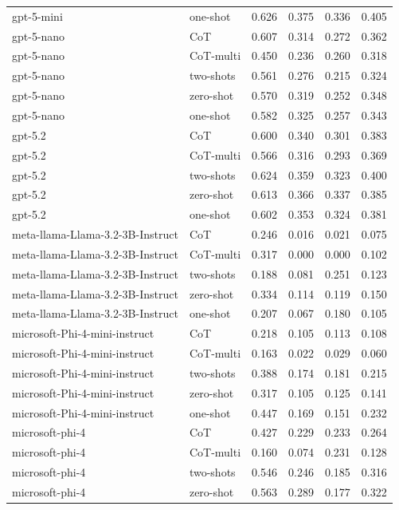 \begin{tabular}{llrrrr}
gpt-5-mini & one-shot & 0.626 & 0.375 & 0.336 & 0.405 \\
gpt-5-nano & CoT & 0.607 & 0.314 & 0.272 & 0.362 \\
gpt-5-nano & CoT-multi & 0.450 & 0.236 & 0.260 & 0.318 \\
gpt-5-nano & two-shots & 0.561 & 0.276 & 0.215 & 0.324 \\
gpt-5-nano & zero-shot & 0.570 & 0.319 & 0.252 & 0.348 \\
gpt-5-nano & one-shot & 0.582 & 0.325 & 0.257 & 0.343 \\
gpt-5.2 & CoT & 0.600 & 0.340 & 0.301 & 0.383 \\
gpt-5.2 & CoT-multi & 0.566 & 0.316 & 0.293 & 0.369 \\
gpt-5.2 & two-shots & 0.624 & 0.359 & 0.323 & 0.400 \\
gpt-5.2 & zero-shot & 0.613 & 0.366 & 0.337 & 0.385 \\
gpt-5.2 & one-shot & 0.602 & 0.353 & 0.324 & 0.381 \\
meta-llama-Llama-3.2-3B-Instruct & CoT & 0.246 & 0.016 & 0.021 & 0.075 \\
meta-llama-Llama-3.2-3B-Instruct & CoT-multi & 0.317 & 0.000 & 0.000 & 0.102 \\
meta-llama-Llama-3.2-3B-Instruct & two-shots & 0.188 & 0.081 & 0.251 & 0.123 \\
meta-llama-Llama-3.2-3B-Instruct & zero-shot & 0.334 & 0.114 & 0.119 & 0.150 \\
meta-llama-Llama-3.2-3B-Instruct & one-shot & 0.207 & 0.067 & 0.180 & 0.105 \\
microsoft-Phi-4-mini-instruct & CoT & 0.218 & 0.105 & 0.113 & 0.108 \\
microsoft-Phi-4-mini-instruct & CoT-multi & 0.163 & 0.022 & 0.029 & 0.060 \\
microsoft-Phi-4-mini-instruct & two-shots & 0.388 & 0.174 & 0.181 & 0.215 \\
microsoft-Phi-4-mini-instruct & zero-shot & 0.317 & 0.105 & 0.125 & 0.141 \\
microsoft-Phi-4-mini-instruct & one-shot & 0.447 & 0.169 & 0.151 & 0.232 \\
microsoft-phi-4 & CoT & 0.427 & 0.229 & 0.233 & 0.264 \\
microsoft-phi-4 & CoT-multi & 0.160 & 0.074 & 0.231 & 0.128 \\
microsoft-phi-4 & two-shots & 0.546 & 0.246 & 0.185 & 0.316 \\
microsoft-phi-4 & zero-shot & 0.563 & 0.289 & 0.177 & 0.322 \\

\end{tabular}
